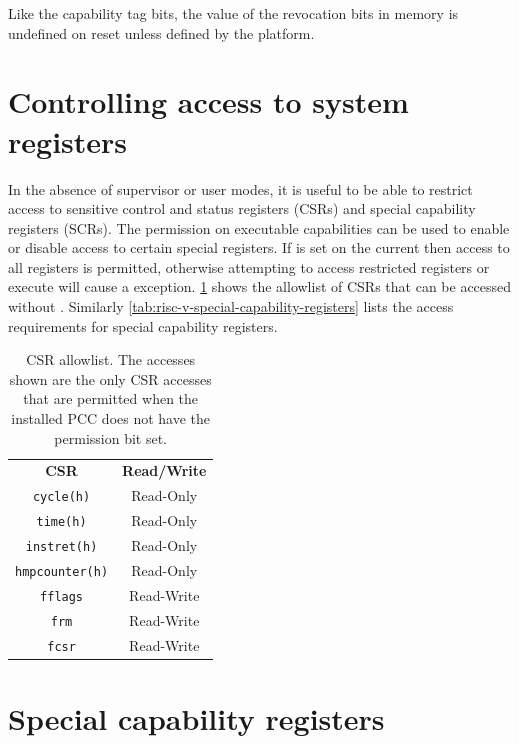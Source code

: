 Like the capability tag bits, the value of the revocation bits in memory is undefined on reset unless defined by the platform.

\section{Controlling access to system registers}
\label{sec:asr}

In the absence of supervisor or user modes, it is useful to be able to restrict access to sensitive control and status registers (CSRs) and special capability registers (SCRs).
The \cappermASR{} permission on executable capabilities can be used to enable or disable access to certain special registers.
If \cappermASR{} is set on the current \PCC{} then access to all registers is permitted, otherwise attempting to access restricted registers or execute  will cause a \cappermASR{} exception.
\cref{tab:risc-v-access-system-registers-whitelist} shows the allowlist of CSRs that can be accessed without \cappermASR{}.
Similarly \cref{tab:risc-v-special-capability-registers} lists the access requirements for special capability registers.

\begin{table}[h!]
\centering
\begin{tabular}{cc}
\toprule
\textbf{CSR}           & \textbf{Read/Write} \\
\texttt{cycle(h)}      & Read-Only           \\
\texttt{time(h)}       & Read-Only           \\
\texttt{instret(h)}    & Read-Only           \\
\texttt{hmpcounter(h)} & Read-Only           \\
[1.5em]
\texttt{fflags}        & Read-Write          \\
\texttt{frm}           & Read-Write          \\
\texttt{fcsr}          & Read-Write          \\
\bottomrule
\end{tabular}
\caption{CSR allowlist. The accesses shown are the only CSR accesses that are permitted when the installed PCC does not have the \cappermASR{} permission bit set.}
\label{tab:risc-v-access-system-registers-whitelist}
\end{table}

\section{Special capability registers}

